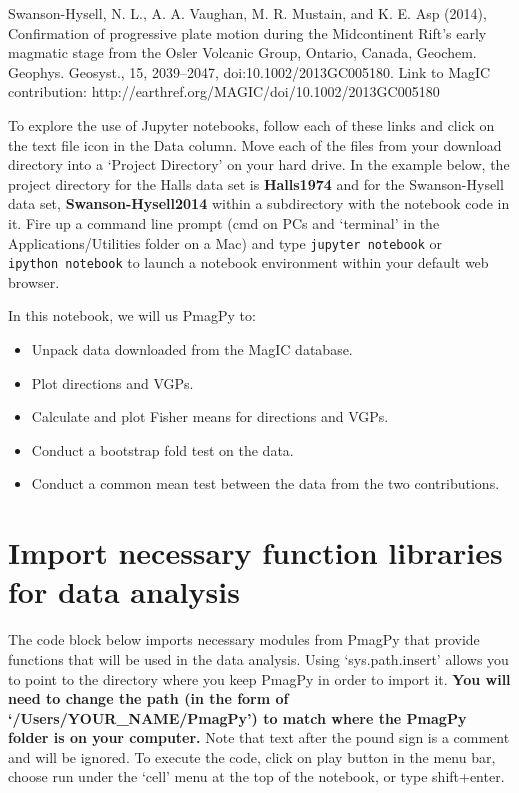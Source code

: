 \documentclass{article}
\providecommand{\tightlist}{%
      \setlength{\itemsep}{0pt}\setlength{\parskip}{0pt}}
\begin{document}
Swanson-Hysell, N. L., A. A. Vaughan, M. R. Mustain, and K. E. Asp
(2014), Confirmation of progressive plate motion during the Midcontinent
Rift's early magmatic stage from the Osler Volcanic Group, Ontario,
Canada, Geochem. Geophys. Geosyst., 15, 2039--2047,
doi:10.1002/2013GC005180. Link to MagIC contribution:
http://earthref.org/MAGIC/doi/10.1002/2013GC005180

To explore the use of Jupyter notebooks, follow each of these links and
click on the text file icon in the Data column. Move each of the files
from your download directory into a `Project Directory' on your hard
drive. In the example below, the project directory for the Halls data
set is \textbf{Halls1974} and for the Swanson-Hysell data set,
\textbf{Swanson-Hysell2014} within a subdirectory with the notebook code
in it. Fire up a command line prompt (cmd on PCs and `terminal' in the
Applications/Utilities folder on a Mac) and type
\texttt{jupyter\ notebook} or \texttt{ipython\ notebook} to launch a
notebook environment within your default web browser.

In this notebook, we will us PmagPy to:

\begin{itemize}
\tightlist
\item
  Unpack data downloaded from the MagIC database.
\item
  Plot directions and VGPs.
\item
  Calculate and plot Fisher means for directions and VGPs.
\item
  Conduct a bootstrap fold test on the data.
\item
  Conduct a common mean test between the data from the two
  contributions.
\end{itemize}

    \section{Import necessary function libraries for data
analysis}\label{import-necessary-function-libraries-for-data-analysis}

    The code block below imports necessary modules from PmagPy that provide
functions that will be used in the data analysis. Using
`sys.path.insert' allows you to point to the directory where you keep
PmagPy in order to import it. \textbf{You will need to change the path
(in the form of `/Users/YOUR\_NAME/PmagPy') to match where the PmagPy
folder is on your computer.} Note that text after the pound sign is a
comment and will be ignored. To execute the code, click on play button
in the menu bar, choose run under the `cell' menu at the top of the
notebook, or type shift+enter.
\end{document}

